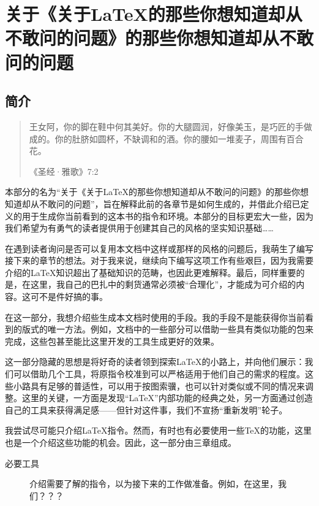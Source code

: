 \part{关于《关于\LaTeX 的那些你想知道却从不敢问的问题》的那些你想知道却从不敢问的问题}

\chapter*{简介}

\begin{quote}
    王女阿，你的脚在鞋中何其美好。你的大腿圆润，好像美玉，是巧匠的手做成的。你的肚脐如圆杯，不缺调和的酒。你的腰如一堆麦子，周围有百合花。

    \hfill《圣经·雅歌》7:2
\end{quote}

本部分的名为“关于《关于\LaTeX 的那些你想知道却从不敢问的问题》的那些你想知道却从不敢问的问题”，旨在解释此前的各章节是如何生成的，并借此介绍已定义的用于生成你当前看到的这本书的指令和环境。本部分的目标更宏大一些，因为我们希望为有勇气的读者提供用于创建其自己的风格的坚实知识基础……

在遇到读者询问是否可以复用本文档中这样或那样的风格的问题后，我萌生了编写接下来的章节的想法。对于我来说，继续向下编写这项工作有些艰巨，因为我需要介绍的\LaTeX 知识超出了基础知识的范畴，也因此更难解释。最后，同样重要的是，在这里，我自己的巴扎中的剩货通常必须被“合理化”，才能成为可介绍的内容。这可不是件好搞的事。

在这一部分，我想介绍些生成本文档时使用的手段。我的手段不是能获得你当前看到的版式的唯一方法。例如，文档中的一些部分可以借助一些具有类似功能的包来完成，这些包甚至能比这里开发的工具生成更好的效果。

这一部分隐藏的思想是将好奇的读者领到探索\LaTeX 的小路上，并向他们展示：我们可以借助几个工具，将原指令校准到可以严格适用于他们自己的需求的程度。这些小路具有足够的普适性，可以用于按图索骥，也可以针对类似或不同的情况来调整。这里的关键，一方面是发现“\LaTeX ”内部功能的经典之处，另一方面通过创造自己的工具来获得满足感——但针对这件事，我们不宣扬“重新发明”轮子。

我尝试尽可能只介绍\LaTeX 指令。然而，有时也有必要使用一些\TeX 的功能，这里也是一个介绍这些功能的机会。因此，这一部分由三章组成。

\begin{description}
    \item[必要工具]介绍需要了解的指令，以为接下来的工作做准备。例如，在这里，我们？？？
\end{description}